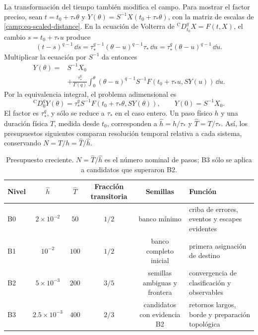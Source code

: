 La transformación del tiempo también modifica el campo. Para mostrar el
factor preciso, sean \(t=t_0+\tau_*\theta\) y
\(Y(\theta)=S^{-1}X(t_0+\tau_*\theta)\), con la matriz de escalas de
\cref{camp:eq-scaled-distance}. En la ecuación de Volterra de
\({}^{\mathrm C}D_{t_0}^qX=F(t,X)\), el cambio
\(s=t_0+\tau_*u\) produce
\[
 (t-s)^{q-1}\,\dd s
 =\tau_*^{q-1}(\theta-u)^{q-1}\tau_*\,\dd u
 =\tau_*^q(\theta-u)^{q-1}\,\dd u.
\]
Multiplicar la ecuación por \(S^{-1}\) da entonces
\begin{equation}
 \begin{aligned}
 Y(\theta)={}&S^{-1}X_0\\
 &+\frac{\tau_*^q}{\Gamma(q)}\int_0^\theta(\theta-u)^{q-1}
       S^{-1}F(t_0+\tau_*u,SY(u))\,\dd u.
 \end{aligned}
 \label{camp:eq-time-scaled-volterra}
\end{equation}
Por la equivalencia integral, el problema adimensional es
\begin{equation}
 {}^{\mathrm C}D_0^qY(\theta)
 =\tau_*^q S^{-1}F(t_0+\tau_*\theta,SY(\theta)),
 \qquad Y(0)=S^{-1}X_0.
 \label{camp:eq-time-scaled-caputo}
\end{equation}
El factor es \(\tau_*^q\), y sólo se reduce a \(\tau_*\) en el caso entero.
Un paso físico \(h\) y una duración física \(T\), medida desde \(t_0\),
corresponden a \(\widehat h=h/\tau_*\) y
\(\widehat T=T/\tau_*\). Así, los presupuestos siguientes comparan resolución
temporal relativa a cada sistema, conservando \(N=T/h=\widehat T/\widehat h\).

\begin{table}[H]
\centering
\caption{Presupuesto creciente. \(N=\widehat T/\widehat h\) es el número
nominal de pasos; B3 sólo se aplica a candidatos que superaron B2.}
\label{camp:tab-budgets}
\begin{tabularx}{\linewidth}{@{}lccccY@{}}
\toprule
Nivel & \(\widehat h\) & \(\widehat T\) & Fracción transitoria & Semillas & Función\\
\midrule
B0 & \(2\times10^{-2}\) & \(50\)  & \(1/2\) & banco mínimo &
criba de errores, eventos y escapes evidentes\\
B1 & \(10^{-2}\) & \(100\) & \(1/2\) & banco completo inicial &
primera asignación de destino\\
B2 & \(5\times10^{-3}\) & \(200\) & \(3/5\) & semillas ambiguas y frontera &
convergencia de clasificación y observables\\
B3 & \(2.5\times10^{-3}\) & \(400\) & \(2/3\) & candidatos con evidencia B2 &
retornos largos, borde y preparación topológica\\
\bottomrule
\end{tabularx}
\end{table}

